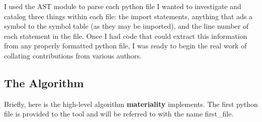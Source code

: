 \documentclass[a4paper,man,natbib,floatsintext]{apa6}
\begin{document}
  I used the AST module to parse each \Gls{python} file I wanted to investigate and catalog three things within each file: the import statements, anything that ads a symbol to the symbol table (as they may be imported), and the line number of each statement in the file. Once I had code that could extract this information from any properly formatted \Gls{python} file, I was ready to begin the real work of collating contributions from various authors.

  \subsection{The Algorithm}
  \singlespace %
  Briefly, here is the high-level algorithm \textbf{materiality} implements. The first \Gls{python} file is provided to the tool and will be referred to with the name \textlangle first\_file\textrangle.
\end{document}
